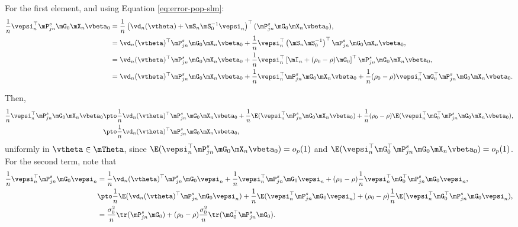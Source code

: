 For the first element, and using Equation \eqref{eq:error-pop-slm}:
\begin{equation*}
\begin{aligned}
\frac{1}{n}\vepsi_n^\top \mP_{jn}^s\mG_0\mX_n\vbeta_0  & = \frac{1}{n}\left(\vd_n(\vtheta) + \mS_n\mS_0^{-1}\vepsi_n\right)^\top (\mP_{jn}^s\mG_0\mX_n\vbeta_0), \\
& =\vd_n(\vtheta)^\top\mP_{jn}^s\mG_0\mX_n\vbeta_0 + \frac{1}{n}\vepsi_n^\top\left(\mS_n\mS_0^{-1}\right)^\top\mP_{jn}^s\mG_0\mX_n\vbeta_0, \\
& = \vd_n(\vtheta)^\top\mP_{jn}^s\mG_0\mX_n\vbeta_0  + \frac{1}{n}\vepsi_n^\top\left[\mI_n + (\rho_0 - \rho)\mG_0\right]^\top\mP_{jn}^s\mG_0\mX_n\vbeta_0, \\
& = \vd_n(\vtheta)^\top\mP_{jn}^s\mG_0\mX_n\vbeta_0 + \frac{1}{n}\vepsi_n^\top\mP_{jn}^s\mG_0\mX_n\vbeta_0 + \frac{1}{n}(\rho_0 - \rho)\vepsi_n^\top\mG_0^\top\mP_{jn}^s\mG_0\mX_n\vbeta_0.
\end{aligned}
\end{equation*}

Then, 
\begin{equation*}
\begin{aligned}
\frac{1}{n}\vepsi_n^\top \mP_{jn}^s\mG_0\mX_n\vbeta_0 &\pto \frac{1}{n}\vd_n(\vtheta)^\top\mP_{jn}^s\mG_0\mX_n\vbeta_0 + \frac{1}{n}\E(\vepsi_n^\top\mP_{jn}^s\mG_0\mX_n\vbeta_0) +\frac{1}{n}(\rho_0 - \rho)\E(\vepsi_n^\top\mG_0^\top\mP_{jn}^s\mG_0\mX_n\vbeta_0), \\
&\pto \frac{1}{n}\vd_n(\vtheta)^\top\mP_{jn}^s\mG_0\mX_n\vbeta_0, 
\end{aligned}
\end{equation*}
%
uniformly in $\vtheta \in \mTheta$, since $\E(\vepsi_n^\top\mP_{jn}^s\mG_0\mX_n\vbeta_0) = o_p(1)$ and $\E(\vepsi_n^\top\mG_0^\top\mP_{jn}^s\mG_0\mX_n\vbeta_0) = o_p(1)$. For the second term, note that
\begin{equation*}
\begin{aligned}
\frac{1}{n}\vepsi_n^\top\mP_{jn}^s\mG_0\vepsi_n & = \frac{1}{n}\vd_n(\vtheta)^\top\mP_{jn}^s\mG_0\vepsi_n + \frac{1}{n}\vepsi_n^\top\mP^s_{jn}\mG_0\vepsi_n + (\rho_0 - \rho)\frac{1}{n}\vepsi_n^\top\mG_0^\top\mP^s_{jn}\mG_{0}\vepsi_n, \\
& \pto \frac{1}{n}\E(\vd_n(\vtheta)^\top\mP_{jn}^s\mG_0\vepsi_n) + \frac{1}{n}\E(\vepsi_n^\top\mP^s_{jn}\mG_0\vepsi_n) + (\rho_0 - \rho)\frac{1}{n}\E(\vepsi_n^\top\mG_0^\top\mP^s_{jn}\mG_{0}\vepsi_n), \\
& = \frac{\sigma_0^2}{n}\tr(\mP_{jn}^s\mG_0) + (\rho_0 - \rho)\frac{\sigma_0^2}{n}\tr(\mG_0^\top\mP_{jn}^s\mG_0).
\end{aligned}
\end{equation*}

